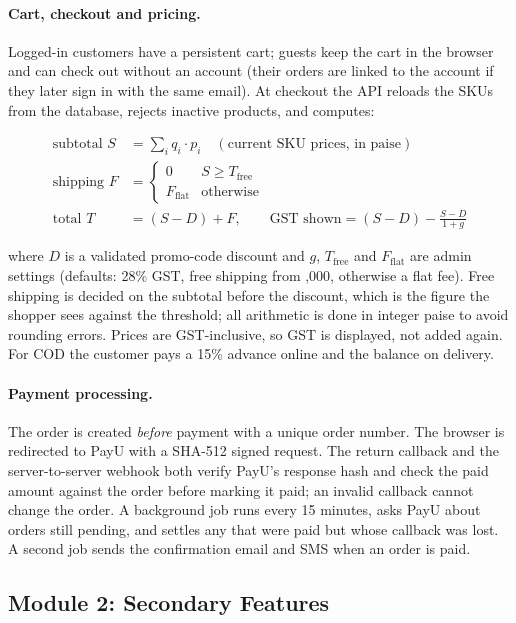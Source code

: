 \documentclass{tietreport}
\begin{document}
\paragraph{Cart, checkout and pricing.}
Logged-in customers have a persistent cart; guests keep the cart in the
browser and can check out without an account (their orders are linked to
the account if they later sign in with the same email). At checkout the API
reloads the SKUs from the database, rejects inactive products, and computes:

\begin{align*}
  \text{subtotal } S &= \textstyle\sum_i q_i \cdot p_i \quad(\text{current SKU prices, in paise})\\
  \text{shipping } F &= \begin{cases}0 & S \ge T_{\text{free}}\\ F_{\text{flat}} & \text{otherwise}\end{cases}\\
  \text{total } T &= (S - D) + F, \qquad \text{GST shown} = (S-D) - \frac{S-D}{1+g}
\end{align*}

where $D$ is a validated promo-code discount and $g$, $T_{\text{free}}$ and
$F_{\text{flat}}$ are admin settings (defaults: 28\% GST, free shipping from
,000, otherwise a  flat fee). Free shipping is decided on the
subtotal before the discount, which is the figure the shopper sees against the
threshold; all arithmetic is done in integer paise to avoid rounding errors. Prices are GST-inclusive, so
GST is displayed, not added again. For COD the customer pays a 15\% advance
online and the balance on delivery.

\paragraph{Payment processing.}
The order is created \emph{before} payment with a unique order number. The
browser is redirected to PayU with a SHA-512 signed request. The return
callback and the server-to-server webhook both verify PayU's response hash
and check the paid amount against the order before marking it paid; an
invalid callback cannot change the order. A background job runs every 15
minutes, asks PayU about orders still pending, and settles any that were paid
but whose callback was lost. A second job sends the confirmation email and SMS
when an order is paid.

\subsection{Module 2: Secondary Features}
\end{document}
